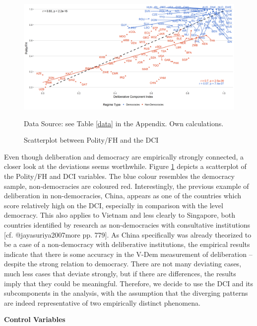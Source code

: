 \documentclass[]{article}
\begin{document}
\begin{figure}[]
    \caption{Scatterplot between Polity/FH and the DCI}
        \label{chinaplot}
    \includegraphics[width=\textwidth]{images/delib_polity.png}
    \flushright
    {\scriptsize Data Source: see Table \ref{data} in the Appendix. Own calculations.  \par}
\end{figure}

Even though deliberation and democracy are empirically strongly
connected, a closer look at the deviations seems worthwhile. Figure
\ref{chinaplot} depicts a scatterplot of the Polity/FH and DCI
variables. The blue colour resembles the democracy sample,
non-democracies are coloured red. Interestingly, the previous example of
deliberation in non-democracies, China, appears as one of the countries
which score relatively high on the DCI, especially in comparison with
the level democracy. This also applies to Vietnam and less clearly to
Singapore, both countries identified by research as non-democracies with
consultative institutions {[}cf. @jayasuriya2007more pp. 779{]}. As
China specifically was already theorized to be a case of a non-democracy
with deliberative institutions, the empirical results indicate that
there is some accuracy in the V-Dem measurement of deliberation --
despite the strong relation to democracy. There are not many deviating
cases, much less cases that deviate strongly, but if there are
differences, the results imply that they could be meaningful. Therefore,
we decide to use the DCI and its subcomponents in the analysis, with the
assumption that the diverging patterns are indeed representative of two
empirically distinct phenomena.

\begin{footnotesize}
\noindent \textbf{Control Variables}
\end{footnotesize}
\end{document}
